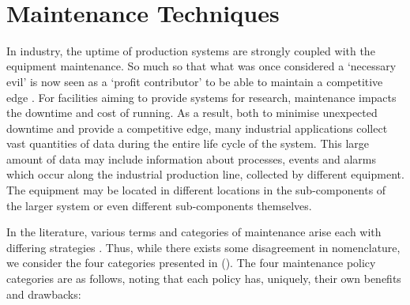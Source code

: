 \documentclass[10pt,oneside]{report}
\begin{document}
\textbf{}\\


\section{Maintenance Techniques}\label{sec:maintenanceTechniques}
In industry, the uptime of production systems are strongly coupled with the equipment maintenance. So much so that what was once considered a `necessary evil' is now seen as a `profit contributor' to be able to maintain a competitive edge \cite{waeyenbergh2002framework, faccio2014industrial}. For facilities aiming to provide systems for research, maintenance impacts the downtime and cost of running. As a result, both to minimise unexpected downtime and provide a competitive edge, many industrial applications collect vast quantities of data during the entire life cycle of the system. This large amount of data may include information about processes, events and alarms \cite{carvalho2019systematic} which occur along the industrial production line, collected by different equipment. The equipment may be located in different locations in the sub-components of the larger system or even different sub-components themselves. 

In the literature, various terms and categories of maintenance arise each with differing strategies \cite{susto2012predictive, mobley2002introduction, susto2016dealing}. Thus, while there exists some disagreement in nomenclature, we consider the four categories presented in (\citet{susto2012predictive}). The four maintenance policy categories are as follows, noting that each policy has, uniquely, their own benefits and drawbacks:
\end{document}
